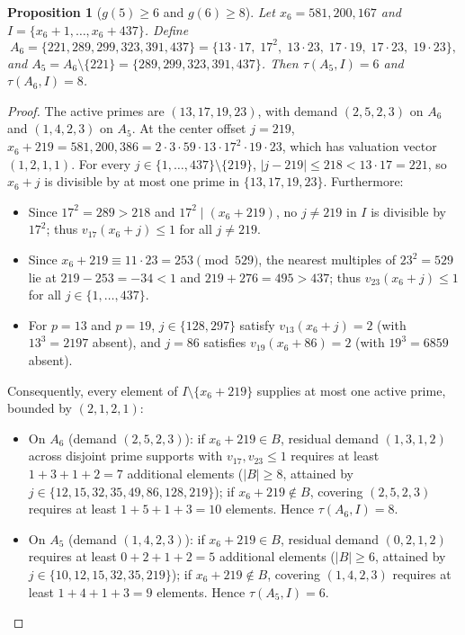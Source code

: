 \documentclass[11pt]{article}
\newtheorem{proposition}[theorem]{Proposition}
\begin{document}
\begin{proposition}[$g(5) \ge 6$ and $g(6) \ge 8$]
\label{prop:g56}
Let $x_6 = 581{,}200{,}167$ and $I = \{x_6 + 1, \dots, x_6 + 437\}$. Define
\[
A_6 = \{221, 289, 299, 323, 391, 437\} = \{13 \cdot 17, \; 17^2, \; 13 \cdot 23, \; 17 \cdot 19, \; 17 \cdot 23, \; 19 \cdot 23\},
\]
and $A_5 = A_6 \setminus \{221\} = \{289, 299, 323, 391, 437\}$. Then $\tau(A_5, I) = 6$ and $\tau(A_6, I) = 8$.
\end{proposition}
\begin{proof}
The active primes are $(13, 17, 19, 23)$, with demand $(2, 5, 2, 3)$ on $A_6$ and $(1, 4, 2, 3)$ on $A_5$. At the center offset $j = 219$, $x_6 + 219 = 581{,}200{,}386 = 2 \cdot 3 \cdot 59 \cdot 13 \cdot 17^2 \cdot 19 \cdot 23$, which has valuation vector $(1, 2, 1, 1)$. For every $j \in \{1, \dots, 437\} \setminus \{219\}$, $|j - 219| \le 218 < 13 \cdot 17 = 221$, so $x_6 + j$ is divisible by at most one prime in $\{13, 17, 19, 23\}$. Furthermore:
\begin{itemize}
\item Since $17^2 = 289 > 218$ and $17^2 \mid (x_6 + 219)$, no $j \neq 219$ in $I$ is divisible by $17^2$; thus $v_{17}(x_6 + j) \le 1$ for all $j \neq 219$.
\item Since $x_6 + 219 \equiv 11 \cdot 23 = 253 \pmod{529}$, the nearest multiples of $23^2 = 529$ lie at $219 - 253 = -34 < 1$ and $219 + 276 = 495 > 437$; thus $v_{23}(x_6 + j) \le 1$ for all $j \in \{1, \dots, 437\}$.
\item For $p = 13$ and $p = 19$, $j \in \{128, 297\}$ satisfy $v_{13}(x_6 + j) = 2$ (with $13^3 = 2197$ absent), and $j = 86$ satisfies $v_{19}(x_6 + 86) = 2$ (with $19^3 = 6859$ absent).
\end{itemize}
Consequently, every element of $I \setminus \{x_6 + 219\}$ supplies at most one active prime, bounded by $(2, 1, 2, 1)$:
\begin{itemize}
\item On $A_6$ (demand $(2, 5, 2, 3)$): if $x_6 + 219 \in B$, residual demand $(1, 3, 1, 2)$ across disjoint prime supports with $v_{17}, v_{23} \le 1$ requires at least $1 + 3 + 1 + 2 = 7$ additional elements ($|B| \ge 8$, attained by $j \in \{12, 15, 32, 35, 49, 86, 128, 219\}$); if $x_6 + 219 \notin B$, covering $(2, 5, 2, 3)$ requires at least $1 + 5 + 1 + 3 = 10$ elements. Hence $\tau(A_6, I) = 8$.
\item On $A_5$ (demand $(1, 4, 2, 3)$): if $x_6 + 219 \in B$, residual demand $(0, 2, 1, 2)$ requires at least $0 + 2 + 1 + 2 = 5$ additional elements ($|B| \ge 6$, attained by $j \in \{10, 12, 15, 32, 35, 219\}$); if $x_6 + 219 \notin B$, covering $(1, 4, 2, 3)$ requires at least $1 + 4 + 1 + 3 = 9$ elements. Hence $\tau(A_5, I) = 6$.
\end{itemize}
\end{proof}
\end{document}
